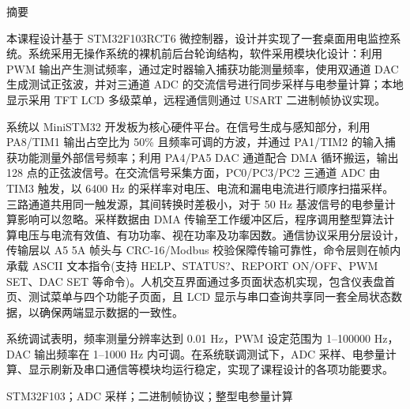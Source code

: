 \documentclass[UTF8,a4paper,zihao=-4,fontset=macnew]{ctexart}
\begin{document}
\setcounter{page}{1}
\thispagestyle{empty}
\setlength{\parindent}{2em}
\label{sec:abstract}
\vspace*{\fill}
\begin{center}
\begin{minipage}{0.85\textwidth}
\begin{center}
{\heiti{} 摘\quad 要}
\end{center}
\vspace{0.45cm}
\setlength{\parindent}{2em}

本课程设计基于 STM32F103RCT6 微控制器，设计并实现了一套桌面用电监控系统。系统采用无操作系统的裸机前后台轮询结构，软件采用模块化设计：利用 PWM 输出产生测试频率，通过定时器输入捕获功能测量频率，使用双通道 DAC 生成测试正弦波，并对三通道 ADC 的交流信号进行同步采样与电参量计算；本地显示采用 TFT LCD 多级菜单，远程通信则通过 USART 二进制帧协议实现。

系统以 MiniSTM32 开发板为核心硬件平台。在信号生成与感知部分，利用 PA8/TIM1 输出占空比为 50\% 且频率可调的方波，并通过 PA1/TIM2 的输入捕获功能测量外部信号频率；利用 PA4/PA5 DAC 通道配合 DMA 循环搬运，输出 128 点的正弦波信号。在交流信号采集方面，PC0/PC3/PC2 三通道 ADC 由 TIM3 触发，以 6400 Hz 的采样率对电压、电流和漏电电流进行顺序扫描采样。三路通道共用同一触发源，其间转换时差极小，对于 50 Hz 基波信号的电参量计算影响可以忽略。采样数据由 DMA 传输至工作缓冲区后，程序调用整型算法计算电压与电流有效值、有功功率、视在功率及功率因数。通信协议采用分层设计，传输层以 A5 5A 帧头与 CRC-16/Modbus 校验保障传输可靠性，命令层则在帧内承载 ASCII 文本指令(支持 HELP、STATUS?、REPORT ON/OFF、PWM SET、DAC SET 等命令)。人机交互界面通过多页面状态机实现，包含仪表盘首页、测试菜单与四个功能子页面，且 LCD 显示与串口查询共享同一套全局状态数据，以确保两端显示数据的一致性。

系统调试表明，频率测量分辨率达到 0.01 Hz，PWM 设定范围为 1--100000 Hz，DAC 输出频率在 1--1000 Hz 内可调。在系统联调测试下，ADC 采样、电参量计算、显示刷新及串口通信等模块均运行稳定，实现了课程设计的各项功能要求。

\vspace{1.55cm}
STM32F103；ADC 采样；二进制帧协议；整型电参量计算
\end{minipage}
\end{center}
\vfill
\clearpage
\end{document}
